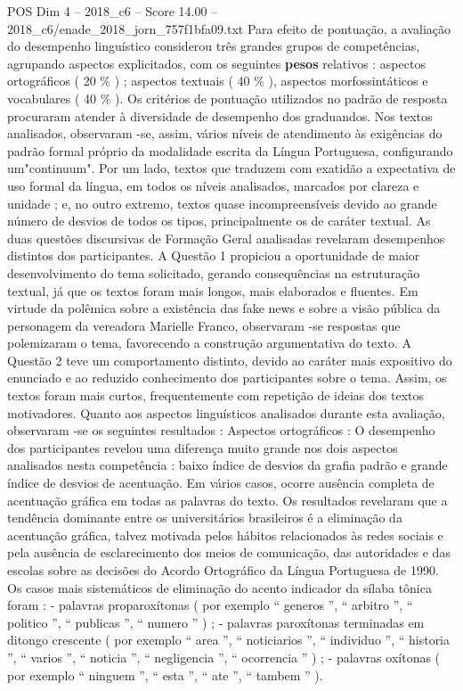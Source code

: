 \begin{textsample}{POS Dim 4 – 2018\_c6 – Score 14.00 – 2018\_c6/enade\_2018\_jorn\_757f1bfa09.txt}
Para efeito de pontuação, a avaliação do desempenho linguístico considerou três grandes grupos de competências, agrupando aspectos explicitados, com os seguintes \textbf{pesos} relativos : aspectos ortográficos ( 20 \% ) ; aspectos textuais ( 40 \% ), aspectos morfossintáticos e vocabulares ( 40 \% ).
Os critérios de pontuação utilizados no padrão de resposta procuraram atender à diversidade de desempenho dos graduandos.
Nos textos analisados, observaram -se, assim, vários níveis de atendimento às exigências do padrão formal próprio da modalidade escrita da Língua Portuguesa, configurando um"continuum".
Por um lado, textos que traduzem com exatidão a expectativa de uso formal da língua, em todos os níveis analisados, marcados por clareza e unidade ; e, no outro extremo, textos quase incompreensíveis devido ao grande número de desvios de todos os tipos, principalmente os de caráter textual.
As duas questões discursivas de Formação Geral analisadas revelaram desempenhos distintos dos participantes.
A Questão 1 propiciou a oportunidade de maior desenvolvimento do tema solicitado, gerando consequências na estruturação textual, já que os textos foram mais longos, mais elaborados e fluentes.
Em virtude da polêmica sobre a existência das fake news e sobre a visão pública da personagem da vereadora Marielle Franco, observaram -se respostas que polemizaram o tema, favorecendo a construção argumentativa do texto.
A Questão 2 teve um comportamento distinto, devido ao caráter mais expositivo do enunciado e ao reduzido conhecimento dos participantes sobre o tema.
Assim, os textos foram mais curtos, frequentemente com repetição de ideias dos textos motivadores.
Quanto aos aspectos linguísticos analisados durante esta avaliação, observaram -se os seguintes resultados : Aspectos ortográficos : O desempenho dos participantes revelou uma diferença muito grande nos dois aspectos analisados nesta competência : baixo índice de desvios da grafia padrão e grande índice de desvios de acentuação.
Em vários casos, ocorre ausência completa de acentuação gráfica em todas as palavras do texto.
Os resultados revelaram que a tendência dominante entre os universitários brasileiros é a eliminação da acentuação gráfica, talvez motivada pelos hábitos relacionados às redes sociais e pela ausência de esclarecimento dos meios de comunicação, das autoridades e das escolas sobre as decisões do Acordo Ortográfico da Língua Portuguesa de 1990.
Os casos mais sistemáticos de eliminação do acento indicador da sílaba tônica foram : - palavras proparoxítonas ( por exemplo “ generos ”, “ arbitro ”, “ politico ”, “ publicas ”, “ numero ” ) ; - palavras paroxítonas terminadas em ditongo crescente ( por exemplo “ area ”, “ noticiarios ”, “ individuo ”, “ historia ”, “ varios ”, “ noticia ”, “ negligencia ”, “ ocorrencia ” ) ; - palavras oxítonas ( por exemplo “ ninguem ”, “ esta ”, “ ate ”, “ tambem ” ).

\end{textsample}
